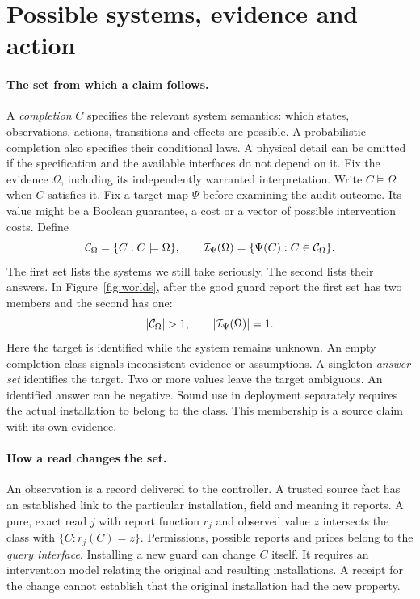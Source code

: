 \section{Possible systems, evidence and action}\label{sec:foundations}
\paragraph{The set from which a claim follows.}
A \emph{completion} \(C\) specifies the relevant system semantics: which states, observations, actions, transitions and effects are possible. A probabilistic completion also specifies their conditional laws. A physical detail can be omitted if the specification and the available interfaces do not depend on it. Fix the evidence \(\Omega\), including its independently warranted interpretation. Write \(C\models\Omega\) when \(C\) satisfies it. Fix a target map \(\Psi\) before examining the audit outcome. Its value might be a Boolean guarantee, a cost or a vector of possible intervention costs. Define
\begin{equation}
 {\cal C}_{\Omega}=\{C:C\models\Omega\},\qquad
 {\cal I}_{\Psi}(\Omega)=\{\Psi(C):C\in{\cal C}_{\Omega}\}.
 \label{eq:identified}
\end{equation}
The first set lists the systems we still take seriously. The second lists their answers. In Figure~\ref{fig:worlds}, after the good guard report the first set has two members and the second has one:
\[
 |{\cal C}_\Omega|>1,\qquad |{\cal I}_\Psi(\Omega)|=1.
\]
Here the target is identified while the system remains unknown. An empty completion class signals inconsistent evidence or assumptions. A singleton \emph{answer set} identifies the target. Two or more values leave the target ambiguous. An identified answer can be negative. Sound use in deployment separately requires the actual installation to belong to the class. This membership is a source claim with its own evidence.

\paragraph{How a read changes the set.}
An observation is a record delivered to the controller. A trusted source fact has an established link to the particular installation, field and meaning it reports. A pure, exact read \(j\) with report function \(r_j\) and observed value \(z\) intersects the class with \(\{C:r_j(C)=z\}\). Permissions, possible reports and prices belong to the \emph{query interface}. Installing a new guard can change \(C\) itself. It requires an intervention model relating the original and resulting installations. A receipt for the change cannot establish that the original installation had the new property.


